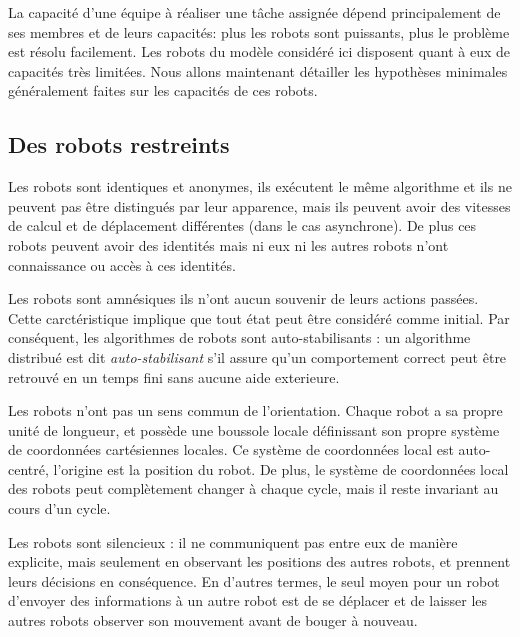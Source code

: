 La capacité d'une équipe à réaliser une tâche assignée dépend
principalement de ses membres et de leurs capacités: plus les robots
sont puissants, plus le problème est résolu facilement. Les robots du
modèle considéré ici disposent quant à eux de capacités très limitées.
Nous allons maintenant détailler les hypothèses minimales généralement
faites sur les capacités de ces robots.
 
\subsection{Des robots restreints}
Les robots sont identiques et anonymes, ils exécutent le même
algorithme et ils ne peuvent pas être distingués par leur apparence,
mais ils peuvent avoir des vitesses de calcul et de déplacement
différentes (dans le cas asynchrone). De plus ces robots peuvent avoir
des identités mais ni eux ni les autres robots n'ont connaissance ou
accès à ces identités.

Les robots sont amnésiques \ie ils n'ont aucun souvenir de leurs
actions
passées. %
Cette carctéristique implique que tout état peut être considéré comme
initial. Par conséquent, les algorithmes de robots sont
auto-stabilisants : un algorithme distribué est dit \emph{auto-stabilisant}
s'il assure qu'un comportement correct peut être retrouvé en un temps
fini sans aucune aide exterieure.

Les robots n'ont pas un sens commun de l'orientation.  Chaque robot a
sa propre unité de longueur, et possède une boussole locale
définissant son propre système de coordonnées cartésiennes locales. Ce
système de coordonnées local est auto-centré, \ie l'origine est la
position du robot. De plus, le système de coordonnées local des robots
peut complètement changer à chaque cycle, mais il reste invariant au
cours d'un cycle.

Les robots sont silencieux : il ne communiquent pas entre eux de
manière explicite, mais seulement en observant les positions des
autres robots, et prennent leurs décisions en conséquence. En d'autres
termes, le seul moyen pour un robot d'envoyer des informations à un
autre robot est de se déplacer et de laisser les autres robots
observer son mouvement avant de bouger à nouveau.

